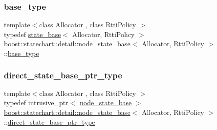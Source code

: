 \subsubsection{\texorpdfstring{base\+\_\+type}{base\_type}}
{\footnotesize\ttfamily template$<$class Allocator , class Rtti\+Policy $>$ \\
typedef \mbox{\hyperlink{classboost_1_1statechart_1_1detail_1_1state__base}{state\+\_\+base}}$<$ Allocator, Rtti\+Policy $>$ \mbox{\hyperlink{classboost_1_1statechart_1_1detail_1_1node__state__base}{boost\+::statechart\+::detail\+::node\+\_\+state\+\_\+base}}$<$ Allocator, Rtti\+Policy $>$\+::\mbox{\hyperlink{classboost_1_1statechart_1_1detail_1_1node__state__base_a6a4897d400d9fb49ee9a7dac1f6c6f58}{base\+\_\+type}}\hspace{0.3cm}{\ttfamily [private]}}

\mbox{\label{classboost_1_1statechart_1_1detail_1_1node__state__base_a52fa5db06246a5d37b5980aa378fa41c}} 
\subsubsection{\texorpdfstring{direct\+\_\+state\+\_\+base\+\_\+ptr\+\_\+type}{direct\_state\_base\_ptr\_type}}
{\footnotesize\ttfamily template$<$class Allocator , class Rtti\+Policy $>$ \\
typedef intrusive\+\_\+ptr$<$ \mbox{\hyperlink{classboost_1_1statechart_1_1detail_1_1node__state__base}{node\+\_\+state\+\_\+base}} $>$ \mbox{\hyperlink{classboost_1_1statechart_1_1detail_1_1node__state__base}{boost\+::statechart\+::detail\+::node\+\_\+state\+\_\+base}}$<$ Allocator, Rtti\+Policy $>$\+::\mbox{\hyperlink{classboost_1_1statechart_1_1detail_1_1node__state__base_a52fa5db06246a5d37b5980aa378fa41c}{direct\+\_\+state\+\_\+base\+\_\+ptr\+\_\+type}}}

\mbox{\label{classboost_1_1statechart_1_1detail_1_1node__state__base_a2b7ddb7642a5452045d9448444426735}} 
